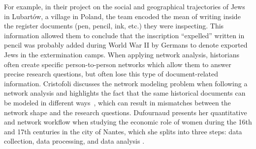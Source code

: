 For example, in their project on the social and geographical trajectories of Jews in Lubartów\cite{zakrzewski1932PopulationRegister2020}, a village in Poland, the team encoded the mean of writing inside the register documents (pen, pencil, ink, etc.) they were inspecting.
This information  allowed them to conclude that the inscription ``expelled'' written in pencil was probably added during World War II by Germans to denote exported Jews in the extermination camps.
When applying network analysis, historians often create specific person-to-person networks which allow them to answer precise research questions, but often lose this type of document-related information.
Cristofoli discusses the network modeling problem when following a network analysis and highlights the fact that the same historical documents can be modeled in different ways~\cite{cristofoliAuxSourcesGrands2008}, which can result in mismatches between the network shape and the research questions.
Dufournaud presents her quantitative and network workflow when studying the economic role of women during the 16th and 17th centuries in the city of Nantes, which she splits into three steps: data collection, data processing, and data analysis \cite{dufournaudCommentRendreVisible2018}.







